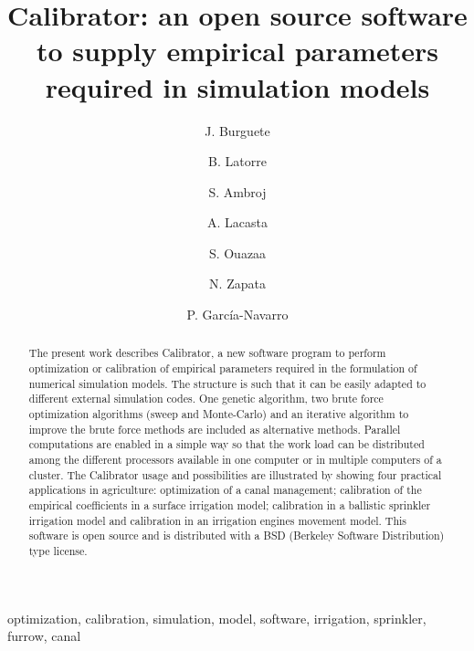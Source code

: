 \documentclass[review,authoryear]{elsarticle}
\begin{document}
\title{Calibrator: an open source software to supply empirical parameters
required in simulation models}

\author[eead,bifi]{J. Burguete}

\author[eead]{B. Latorre}

\author[kit]{S. Ambroj}

\author[unizar]{A. Lacasta}

\author[eead]{S. Ouazaa}

\author[eead]{N. Zapata}

\author[unizar]{P. García-Navarro}


\address[eead]{Soil and Water, EEAD / CSIC.
P.O. Box 13034, 50080~Zaragoza, Spain.}
\address[bifi]{BIFI: Instituto de Biocomputación y Física de Sistemas Complejos,
Universidad de Zaragoza.
Mariano Esquillor, Edificio I+D, 50009~Zaragoza, Spain.}
\address[kit]{Steinbuch Centre for Computing (SCC),
Karlsruhe Institute of Technology (KIT).
KIT-Campus Nord, Hermann von Helmholtzplatz 1, 76344 Eggenstein - Leopoldshafen,
Germany.}
\address[unizar]{Fluid Mechanics, LIFTEC, CSIC-Universidad de Zaragoza.
María de Luna 3, 50018~Zaragoza, Spain.}

\begin{keyword}
optimization, calibration, simulation, model, software, irrigation, sprinkler,
furrow, canal
\end{keyword}

\begin{abstract}
The present work describes Calibrator, a new software program to perform
optimization or calibration of empirical parameters required in the
formulation of numerical simulation models. The structure is such that it can be
easily adapted to different external simulation codes.
One genetic algorithm, two brute force optimization algorithms (sweep and
Monte-Carlo) and an iterative algorithm to improve the brute force methods are
included as alternative methods.
Parallel computations are enabled in a simple way so that the work load can be
distributed among the different processors available in one computer or in
multiple computers of a cluster.
The Calibrator usage and possibilities are illustrated by showing four practical
applications in agriculture: optimization of a canal management; calibration of
the empirical coefficients in a surface irrigation model; calibration in a
ballistic sprinkler irrigation model and calibration in an irrigation engines
movement model.
This software is open source and is distributed with a BSD (Berkeley Software
Distribution) type license.
\end{abstract}
\end{document}
